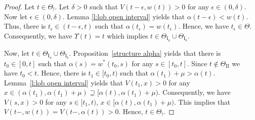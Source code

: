 \documentclass[11pt]{scrartcl}
\newcommand{\lasttrade}{\Upsilon}
\begin{document}
\begin{proof}
 Let $t\in\Theta_!$. Let $\delta>0$ such that $V(t-\epsilon,w(t))>0$ for any $\epsilon\in(0,\delta)$. 
 Now let $\epsilon\in(0,\delta)$. Lemma \ref{l:lob open interval} yields that $\alpha(t-\epsilon) < w(t)$. 
 Thus, there is $t_\epsilon\in (t-\epsilon,t)$ such that $\alpha(t_\epsilon)=w(t_\epsilon)$. Hence, 
 we have $t_\epsilon\in\Theta$. Consequently, we have $\lasttrade(t) = t$ which 
 implies $t\in \Theta_{\mathrm{I}_a} \cup \Theta_{\mathrm{I}_b}$.
 
 Now, let $t\in \Theta_{\mathrm{I}_a} \cup \Theta_{\mathrm{I}_b}$. 
 Proposition~\ref{structure alpha} yields that there is $t_0\in[0,t]$ such 
 that $\alpha(s)=w^*(t_0,s)$ for any $s\in[t_0,t]$. Since $t\notin\Theta_{\mathrm{II}}$ we 
 have $t_0<t$. Hence, there is $t_1\in[t_0,t)$ such that $\alpha(t_1)+\mu > \alpha(t)$. 
 Lemma~\ref{l:lob open interval} yields that $V(t_1,x) > 0$ for 
 any $x\in (\alpha(t_1),\alpha(t_1)+\mu)\supseteq [\alpha(t),\alpha(t_1)+\mu)$. 
 Consequently, we have $V(s,x)>0$ for any $s\in [t_1,t)$, $x\in [\alpha(t),\alpha(t_1)+\mu)$. 
 This implies that $V(t-,w(t)) = V(t-,\alpha(t)) > 0$. Hence, $t\in\Theta_!$.
\end{proof}

\newcommand{\etalchar}[1]{$^{#1}$}
\end{document}
